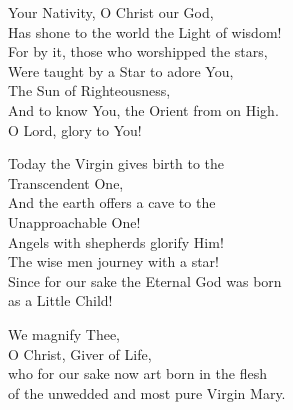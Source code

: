 \documentclass{article}
\begin{document}
%
%
Your Nativity, O Christ our God,\\
Has shone to the world the Light of wisdom!\\
For by it, those who worshipped the stars,\\
Were taught by a Star to adore You,\\
The Sun of Righteousness,\\
And to know You, the Orient from on High.\\
O Lord, glory to You!

%
Today the Virgin gives birth to the \\
   \cont Transcendent One,\\
And the earth offers a cave to the \\
    \cont Unapproachable One!\\
Angels with shepherds glorify Him!\\
The wise men journey with a star!\\
Since for our sake the Eternal God was born\\
as a Little Child!

%
We magnify Thee, \\
O Christ, Giver of Life, \\
who for our sake now art born in the flesh \\
of the unwedded and most pure Virgin Mary.
\end{document}
